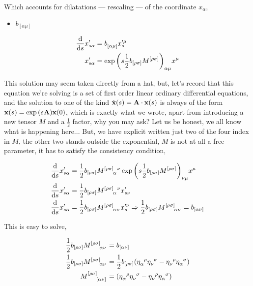 Which accounts for dilatations --- rescaling --- of the coordinate $x_\alpha$,

\begin{itemize}
    \item $b_{[\alpha\mu]}$
\end{itemize}

\begin{align*}
    \dv{}{s}x'_{s\alpha}&=\tensor{b}{_{[\alpha}_{\mu]}}x'^\mu_s\\
    x'_{s\alpha}&=\tensor{\exp\qty(s\frac12b_{[\rho\sigma]}\tensor{M}{^{[\rho}^{\sigma]}})}{_\alpha_\mu}x^\mu
\end{align*}

This solution may seem taken directly from a hat, but, let's record that this equation we're solving is a set of first order linear ordinary differential equations, 
and the solution to one of the kind $\dot{\vb x}\qty(s)=\vb A\cdot \vb x\qty(s)$ is always of the form $\vb x\qty(s)=\exp\qty(s\vb A)\vb x\qty(0)$, which is exactly what we wrote, apart 
from introducing a new tensor $M$ and a $\frac12$ factor, why you may ask? Let us be honest, we all know what is happening here... But, we have explicit written just two of the four index in $M$, the other two 
stands outside the exponential, $M$ is not at all a free parameter, it has to satisfy the consistency condition, 

\begin{align*}
    \dv{}{s}x'_{s\alpha}&=\frac12b_{[\rho\sigma]}\tensor{M}{^{[\rho}^{\sigma]}_\alpha^\nu}\tensor{\exp\qty(s\frac12b_{[\rho\sigma]}\tensor{M}{^{[\rho}^{\sigma]}})}{_\nu_\mu}x^\mu\\
    \dv{}{s}x'_{s\alpha}&=\frac12b_{[\rho\sigma]}\tensor{M}{^{[\rho}^{\sigma]}_\alpha^\nu}x'_{s\nu}\\
    \dv{}{s}x'_{s\alpha}&=\frac12b_{[\rho\sigma]}\tensor{M}{^{[\rho}^{\sigma]}_\alpha_\nu}x'^\nu_{s}\Rightarrow \frac12b_{[\rho\sigma]}\tensor{M}{^{[\rho}^{\sigma]}_\alpha_\nu}=b_{[\alpha\nu]}
\end{align*}

This is easy to solve,

\begin{align*}
    \frac12b_{[\rho\sigma]}\tensor{M}{^{[\rho}^{\sigma]}_\alpha_\nu}&=b_{[\alpha\nu]}\\
    \frac12b_{[\rho\sigma]}\tensor{M}{^{[\rho}^{\sigma]}_\alpha_\nu}&=\frac12b_{[\rho\sigma]}\qty(\tensor{\eta}{_\alpha^\rho}\tensor{\eta}{_\nu^\sigma}-\tensor{\eta}{_\nu^\rho}\tensor{\eta}{_\alpha^\sigma})\\
    \tensor{M}{^{[\rho}^{\sigma]}_{[\alpha}_{\nu]}}&=\qty(\tensor{\eta}{_\alpha^\rho}\tensor{\eta}{_\nu^\sigma}-\tensor{\eta}{_\nu^\rho}\tensor{\eta}{_\alpha^\sigma})
\end{align*}

